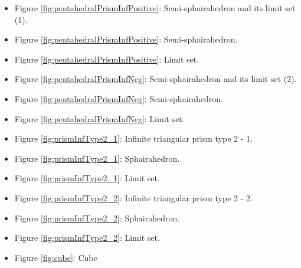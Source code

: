 \documentclass[suppldata, dvipdfmx]{interact}
\theoremstyle{plain}%
\theoremstyle{definition}
\theoremstyle{remark}
\theoremstyle{problemstyle}
\begin{document}
\begin{itemize}
\item Figure \ref{fig:pentahedralPrismInfPositive}: Semi-sphairahedron and its limit set (1). 
\item Figure
      \ref{fig:pentahedralPrismInfPositive}: Semi-sphairahedron.
\item Figure
      \ref{fig:pentahedralPrismInfPositive}:
      Limit set.


\item Figure \ref{fig:pentahedralPrismInfNeg}: Semi-sphairahedron and its limit set (2).
\item Figure
      \ref{fig:pentahedralPrismInfNeg}:
      Semi-sphairahedron.
\item Figure
      \ref{fig:pentahedralPrismInfNeg}:
      Limit set.
\item Figure \ref{fig:prismInfType2_1}: Infinite triangular prism type 2 - 1.
\item Figure \ref{fig:prismInfType2_1}: Sphairahedron.
\item Figure \ref{fig:prismInfType2_1}: Limit set.
\item Figure \ref{fig:prismInfType2_2}: Infinite triangular prism type 2 - 2.
\item Figure \ref{fig:prismInfType2_2}: Sphairahedron.
\item Figure \ref{fig:prismInfType2_2}: Limit set.
\item Figure \ref{fig:cube}: Cube


\end{itemize}
\end{document}
